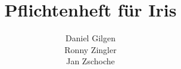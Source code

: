 \documentclass[a4paper, 12pt, oneside]{article}
\begin{document}
  
 
\title{\textbf{Pflichtenheft für Iris}}
\author{Daniel Gilgen\\ Ronny Zingler \\ Jan Zschoche}
\maketitle
 
\newpage
\tableofcontents
\pagestyle{fancy}

\newpage




 
 
 



 
\listoffigures
 
\end{document}
